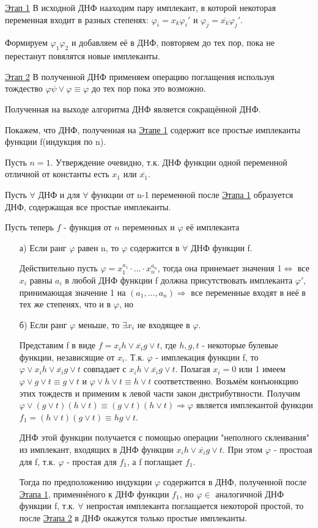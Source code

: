 \documentclass{article}
\begin{document}
\underline{Этап 1}
В исходной ДНФ нааходим пару имплекант, в которой некоторая переменная входит в разных степенях: $\varphi_i = x_k\varphi_i'$ и $\varphi_j = \overline{x_k}\varphi_j'$.\par
Формируем $\varphi_1\varphi_2$ и добавляем её в ДНФ, повторяем до тех пор, пока не перестанут повялятся новые имплеканты.

\underline{Этап 2}
В полученной ДНФ применяем операцию поглащения используя тождество $\varphi\psi\vee\varphi\equiv\varphi$ до тех пор пока это возможно.

\thr Полученная на выходе алгоритма ДНФ является сокращённой ДНФ.

\proof Покажем, что ДНФ, полученная на \underline{Этапе 1} содержит все простые имплеканты функции f(индукция по n).\par
Пусть $n=1$. Утверждение очевидно, т.к. ДНФ функции одной переменной отличной от константы есть $x_1$ или $\overline{x_1}$.\par
Пусть $\forall$ ДНФ и для $\forall$ функции от n-1 переменной после \underline{Этапа 1} образуется ДНФ, содержащая все простые имплеканты.\par
Пусть теперь $f$ - функция от $n$ переменных и $\varphi$ её имплеканта 
\begin{itemize}
	\item[а)]Если ранг $\varphi$ равен n, то $\varphi$ содержится в $\forall$ ДНФ функции f.\par
Действительно пусть $\varphi = x_1^{a_1}\cdot \dotsc \cdot x_n^{a_n}$, тогда она принемает значения 1$\Leftrightarrow$ все $x_i$ равны $a_i$ в любой ДНФ функции f должна присутствовать имплеканта $\varphi'$, принимающая значение 1 на $(a_1, \dotsc, a_n) \Rightarrow$ все переменные входят в неё в тех же степенях, что и в $\varphi$, но
	\item[б)]Если ранг $\varphi$ меньше, то $\exists x_i$ не входящее в $\varphi$.\par
Представим f в виде $f=x_ih\vee \overline{x_i}g \vee t$, где $h,g,t$ - некоторые булевые функции, независящие от $x_i$. Т.к. $\varphi$ - имплекация функции f, то $\varphi\vee x_ih\vee \overline{x_i}g\vee t$ совпадает с $x_ih\vee \overline{x_i}g\vee t$. Полагая $x_i = 0$ или 1 имеем $\varphi\vee g\vee t\equiv g\vee t$ и $\varphi\vee h\vee t\equiv h\vee t$ соответственно. Возьмём конъюнкцию этих тождеств и применим к левой части закон дистрибутвности. Получим $\varphi\vee (g\vee t)(h\vee t) \equiv (g\vee t)(h\vee t) \Rightarrow \varphi$ является имплекантой функции $f_1=(h\vee t)(g\vee t)\equiv hg\vee t$.\par ДНФ этой функции получается с помощью операции "неполного склеивания" из имплекант, входящих в ДНФ функции $x_ih\vee \overline{x_i}g \vee t$. При этом $\varphi$ - простоая для f, т.к. $\varphi$ - простая для $f_1$, а f поглащает $f_1$.\par
Тогда по предположению индукции $\varphi$ содержится в ДНФ, полученной после \underline{Этапа 1}, применнёного к ДНФ функции $f_1$, но $\varphi \in$ аналогичной ДНФ функции f, т.к. $\forall$ непростая имплеканта поглащается некоторой простой, то после \underline{Этапа 2} в ДНФ окажутся только простые имплеканты.
\end{itemize}
\end{document}

